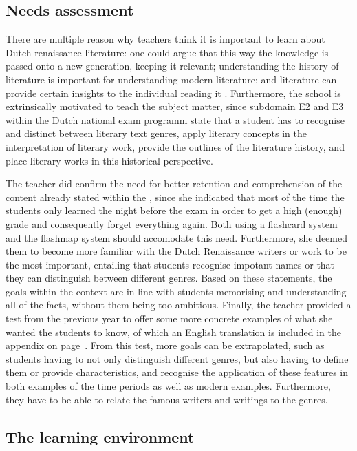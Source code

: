 \subsection{Needs assessment}
\label{subsec:needsassessment}

There are multiple reason why teachers think it is important to learn about Dutch renaissance literature: one could argue that this way the knowledge is passed onto a new generation, keeping it relevant; understanding the history of literature is important for understanding modern literature; and literature can provide certain insights to the individual reading it \cite{opinion1, opinion2}. Furthermore, the school is extrinsically motivated to teach the subject matter, since subdomain E2 and E3 within the Dutch national exam programm state that a student has to recognise and distinct between literary text genres, apply literary concepts in the interpretation of literary work, provide the outlines of the literature history, and place literary works in this historical perspective.

The teacher did confirm the need for better retention and comprehension of the content already stated within the , since she indicated that most of the time the students only learned the night before the exam in order to get a high (enough) grade and consequently forget everything again. Both using a flashcard system and the flashmap system should accomodate this need. Furthermore, she deemed them to become more familiar with the Dutch Renaissance writers or work to be the most important, entailing that students recognise impotant names or that they can distinguish between different genres. Based on these statements, the goals within the context are in line with students memorising and understanding all of the facts, without them being too ambitious. Finally, the teacher provided a test from the previous year to offer some more concrete examples of what she wanted the students to know, of which an English translation is included in the appendix on page~\pageref{app:exampletest}. From this test, more goals can be extrapolated, such as students having to not only distinguish different genres, but also having to define them or provide characteristics, and recognise the application of these features in both examples of the time periods as well as modern examples. Furthermore, they have to be able to relate the famous writers and writings to the genres.

\subsection{The learning environment}
\label{subsec:learningenvironment}

